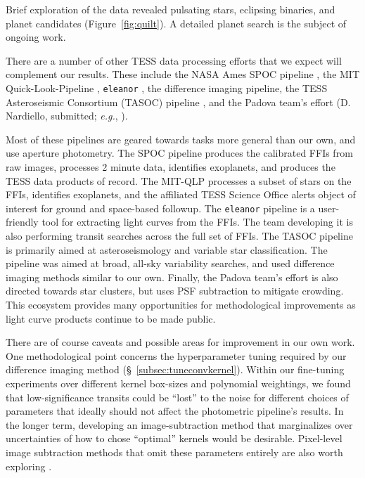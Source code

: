 \documentclass[12pt,twocolumn,tighten]{aastex62}
\begin{document}
Brief exploration of the data revealed pulsating stars, eclipsing
binaries, and planet candidates (Figure~\ref{fig:quilt}).  A detailed
planet search is the subject of ongoing work.

There are a number of other TESS data
processing efforts that we expect will complement our results.
These include the NASA Ames SPOC pipeline \citep{jenkins_spoc_2010}, the MIT
Quick-Look-Pipeline \citep{huang_tess_2018}, \texttt{eleanor}
\citep{feinstein_eleanor_2019}, the \citet{oelkers_precision_2018}
difference imaging pipeline, the TESS Asteroseismic Consortium (TASOC)
pipeline \citep{lund_k2p_2015,handberg_tess_2019}, and the Padova
team's effort (D{.} Nardiello, submitted; {\it e.g.},
\citealt{libralato_psf-based_2016}). 

Most of these pipelines are geared towards tasks more general than our
own, and use aperture photometry.  The SPOC pipeline produces the
calibrated FFIs from raw images, processes 2 minute data, identifies
exoplanets, and produces the TESS data products of record.  The
MIT-QLP processes a subset of stars on the FFIs, identifies
exoplanets, and the affiliated TESS Science Office alerts object of
interest for ground and space-based followup.  The \texttt{eleanor}
pipeline is a user-friendly tool for extracting light curves from the
FFIs.  The team developing it is also performing transit searches
across the full set of FFIs.  The TASOC pipeline is primarily aimed at
asteroseismology and variable star classification.  The
\citeauthor{oelkers_precision_2018} pipeline was aimed at broad,
all-sky variability searches, and used difference imaging methods
similar to our own.  Finally, the Padova team's effort is also
directed towards star clusters, but uses PSF subtraction to mitigate
crowding.  This ecosystem provides many opportunities for
methodological improvements as light curve products continue to be
made public.

There are of course caveats and possible areas for improvement in our
own work.  One methodological point concerns the hyperparameter tuning
required by our difference imaging method
(\S~\ref{subsec:tuneconvkernel}).  Within our fine-tuning experiments
over different kernel box-sizes and polynomial weightings, we found
that low-significance transits  could be ``lost'' to the noise for
different choices of parameters that ideally should not affect the
photometric pipeline's results.  In the longer term, developing an
image-subtraction method that marginalizes over uncertainties of how
to chose ``optimal'' kernels would be desirable.  Pixel-level image
subtraction methods that omit these parameters entirely are also worth
exploring \citep{wang_pixel-level_2017}.
\end{document}
